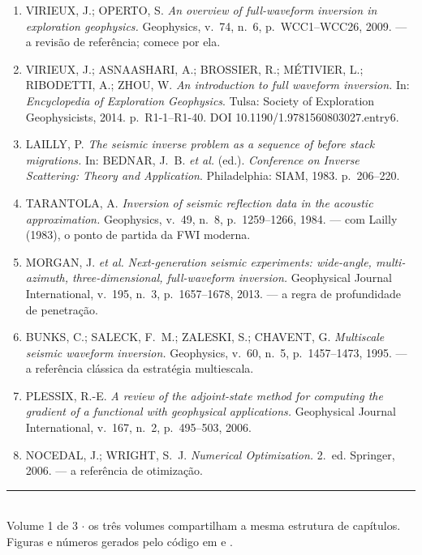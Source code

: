 \documentclass[11pt,a4paper,oneside]{report}
\begin{document}
\begin{enumerate}[leftmargin=*, itemsep=3pt]
\item VIRIEUX, J.; OPERTO, S. \emph{An overview of full-waveform inversion in
exploration geophysics.} Geophysics, v.~74, n.~6, p.~WCC1--WCC26, 2009.
--- a revis\~ao de refer\^encia; comece por ela.

\item VIRIEUX, J.; ASNAASHARI, A.; BROSSIER, R.; M\'ETIVIER, L.; RIBODETTI,
A.; ZHOU, W. \emph{An introduction to full waveform inversion.} In:
\emph{Encyclopedia of Exploration Geophysics}. Tulsa: Society of Exploration
Geophysicists, 2014. p.~R1-1--R1-40. DOI 10.1190/1.9781560803027.entry6.

\item LAILLY, P. \emph{The seismic inverse problem as a sequence of before
stack migrations.} In: BEDNAR, J.~B. \emph{et al.} (ed.). \emph{Conference on
Inverse Scattering: Theory and Application}. Philadelphia: SIAM, 1983.
p.~206--220.

\item TARANTOLA, A. \emph{Inversion of seismic reflection data in the acoustic
approximation.} Geophysics, v.~49, n.~8, p.~1259--1266, 1984. --- com
Lailly (1983), o ponto de partida da FWI moderna.

\item MORGAN, J. \emph{et al.} \emph{Next-generation seismic experiments:
wide-angle, multi-azimuth, three-dimensional, full-waveform inversion.}
Geophysical Journal International, v.~195, n.~3, p.~1657--1678, 2013. --- a
regra de profundidade de penetra\c{c}\~ao.

\item BUNKS, C.; SALECK, F.~M.; ZALESKI, S.; CHAVENT, G. \emph{Multiscale
seismic waveform inversion.} Geophysics, v.~60, n.~5, p.~1457--1473, 1995.
--- a refer\^encia cl\'assica da estrat\'egia multiescala.

\item PLESSIX, R.-E. \emph{A review of the adjoint-state method for computing
the gradient of a functional with geophysical applications.} Geophysical
Journal International, v.~167, n.~2, p.~495--503, 2006.

\item NOCEDAL, J.; WRIGHT, S.~J. \emph{Numerical Optimization.} 2.~ed.
Springer, 2006. --- a refer\^encia de otimiza\c{c}\~ao.
\end{enumerate}

\vfill
\begin{center}
{\color{cianofwi}\rule{0.55\textwidth}{1pt}}\\[0.35cm]
{\small Volume 1 de 3 $\cdot$ os tr\^es volumes compartilham a mesma estrutura
de cap\'itulos.\\
Figuras e n\'umeros gerados pelo c\'odigo em  e .}
\end{center}
\end{document}
